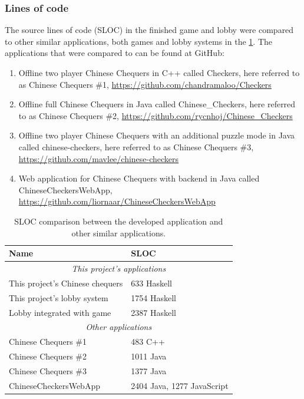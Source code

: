 \documentclass[a4paper]{article}
\begin{document}
\subsubsection{Lines of code}
\label{subsub:lines-of-code-results}
The source lines of code (SLOC) in the finished game and lobby were compared to other similar applications, both games and lobby systems in the \cref{tab:sloc-comparison}. The applications that were compared to can be found at GitHub:
\begin{enumerate}
    \item Offline two player Chinese Chequers in C++ called Checkers, here referred to as Chinese Chequers \#1, \url{https://github.com/chandramaloo/Checkers}
    \item Offline full Chinese Chequers in Java called Chinese\_Checkers, here referred to as Chinese Chequers \#2, \url{https://github.com/rycnhoj/Chinese_Checkers}
    \item Offline two player Chinese Chequers with an additional puzzle mode in Java called chinese-checkers, here referred to as Chinese Chequers \#3,  \url{https://github.com/mavlee/chinese-checkers}
    \item Web application for Chinese Chequers with backend in Java called ChineseCheckersWebApp, \url{https://github.com/liornaar/ChineseCheckersWebApp}
\end{enumerate}

\begin{table}[h!]
    \centering
    \begin{tabular}{|l|l|}
        \hline
        \textbf{Name}  & \textbf{SLOC}                                      \\ \hline 
        \multicolumn{2}{|c|}{\textit{This project's applications}}          \\
        This project's Chinese chequers     & 633 Haskell                   \\ \hline
        This project's lobby system         & 1754 Haskell                  \\ \hline
        Lobby integrated with game          & 2387 Haskell                  \\ \hline 
        \multicolumn{2}{|c|}{\textit{Other applications}}                   \\
        Chinese Chequers \#1                & 483  C++                      \\ \hline
        Chinese Chequers \#2                & 1011 Java                     \\ \hline
        Chinese Chequers \#3                & 1377 Java                     \\ \hline
        ChineseCheckersWebApp               & 2404 Java, 1277 JavaScript    \\ \hline 
        
    \end{tabular}
    \caption{SLOC comparison between the developed application and other similar applications.}
    \label{tab:sloc-comparison}
\end{table}
\end{document}
